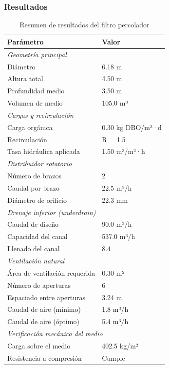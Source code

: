 \documentclass[12pt,a4paper]{article}
\begin{document}
\subsubsection{Resultados}

\begin{table}[H]
\centering
\caption{Resumen de resultados del filtro percolador}
\begin{tabular}{ll}
\toprule
\textbf{Parámetro} & \textbf{Valor} \\
\midrule
\multicolumn{2}{l}{\textit{Geometría principal}} \\
Diámetro & 6.18 m \\
Altura total & 4.50 m \\
Profundidad medio & 3.50 m \\
Volumen de medio & 105.0 m³ \\
\midrule
\multicolumn{2}{l}{\textit{Cargas y recirculación}} \\
Carga orgánica & 0.30 kg DBO/m³·d \\
Recirculación & R = 1.5 \\
Tasa hidráulica aplicada & 1.50 m³/m²·h \\
\midrule
\multicolumn{2}{l}{\textit{Distribuidor rotatorio}} \\
Número de brazos & 2 \\
Caudal por brazo & 22.5 m³/h \\
Diámetro de orificio & 22.3 mm \\
\midrule
\multicolumn{2}{l}{\textit{Drenaje inferior (underdrain)}} \\
Caudal de diseño & 90.0 m³/h \\
Capacidad del canal & 537.0 m³/h \\
Llenado del canal & 8.4 \\%
\midrule
\multicolumn{2}{l}{\textit{Ventilación natural}} \\
Área de ventilación requerida & 0.30 m² \\
Número de aperturas & 6 \\
Espaciado entre aperturas & 3.24 m \\
Caudal de aire (mínimo) & 1.8 m³/h \\
Caudal de aire (óptimo) & 5.4 m³/h \\
\midrule
\multicolumn{2}{l}{\textit{Verificación mecánica del medio}} \\
Carga sobre el medio & 402.5 kg/m² \\
Resistencia a compresión & Cumple \\
\bottomrule
\end{tabular}
\end{table}
\end{document}
